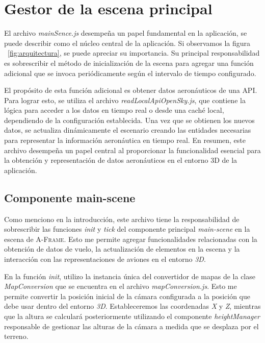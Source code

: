 \documentclass[a4paper, 11pt]{book}
\begin{document}
\section{Gestor de la escena principal}
\label{sec:mainScene.js}
El archivo \emph{mainSence.js} desempeña un papel fundamental en la aplicación, se puede describir como el núcleo central de la aplicación. Si observamos la figura ~\ref{fig:arquitectura}, se puede apreciar su importancia. Su principal responsabilidad es sobrescribir el método de inicialización de la escena para agregar una función adicional que se invoca periódicamente según el intervalo de tiempo configurado.

El propósito de esta función adicional es obtener datos aeronáuticos de una \textsc{API}. Para lograr esto, se utiliza el archivo \emph{readLocalApiOpenSky.js}, que contiene la lógica para acceder a los datos en tiempo real o desde una caché local, dependiendo de la configuración establecida. Una vez que se obtienen los nuevos datos, se actualiza dinámicamente el escenario creando las entidades necesarias para representar la información aeronáutica en tiempo real.
En resumen, este archivo desempeña un papel central al proporcionar la funcionalidad esencial para la obtención y representación de datos aeronáuticos en el entorno \textsc{3D} de la aplicación.

\subsection{Componente main-scene}
\label{sec:mainScene}
Como menciono en la introducción, este archivo tiene la responsabilidad de sobrescribir las funciones \emph{init} y \emph{tick} del componente principal \emph{main-scene} en la escena de \textsc{A-Frame}. Esto me permite agregar funcionalidades relacionadas con la obtención de datos de vuelo, la actualización de elementos en la escena y la interacción con las representaciones de aviones en el entorno \emph{\gls{3D}}.

En la función \emph{init}, utilizo la instancia única del convertidor de mapas de la clase \emph{MapConversion} que se encuentra en el archivo \emph{mapConversion.js}. Esto me permite convertir la posición inicial de la cámara configurada a la posición que debe usar dentro del entorno \emph{3D}. Estableceremos las coordenadas \emph{X} y \emph{Z}, mientras que la altura se calculará posteriormente utilizando el componente \emph{heightManager} responsable de gestionar las alturas de la cámara a medida que se desplaza por el terreno.
\end{document}
